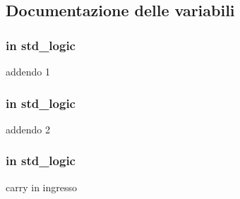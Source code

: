 \subsection{Documentazione delle variabili}
\subsubsection[{\texorpdfstring{add1}{add1}}]{ {\bfseries \textcolor{vhdlchar}{in}\textcolor{vhdlchar}{ }} {\bfseries \textcolor{vhdlchar}{std\+\_\+logic}\textcolor{vhdlchar}{ }} \hspace{0.3cm}{\ttfamily [Port]}}\hypertarget{group___base_cell_ga2b16ee1ce0d8ffb8f85ccea13f8ba38d}{}\label{group___base_cell_ga2b16ee1ce0d8ffb8f85ccea13f8ba38d}


addendo 1 

\subsubsection[{\texorpdfstring{add2}{add2}}]{ {\bfseries \textcolor{vhdlchar}{in}\textcolor{vhdlchar}{ }} {\bfseries \textcolor{vhdlchar}{std\+\_\+logic}\textcolor{vhdlchar}{ }} \hspace{0.3cm}{\ttfamily [Port]}}\hypertarget{group___base_cell_gac3ebb689e34fc5e7657726b18d8b5369}{}\label{group___base_cell_gac3ebb689e34fc5e7657726b18d8b5369}


addendo 2 

\subsubsection[{\texorpdfstring{carryin}{carryin}}]{ {\bfseries \textcolor{vhdlchar}{in}\textcolor{vhdlchar}{ }} {\bfseries \textcolor{vhdlchar}{std\+\_\+logic}\textcolor{vhdlchar}{ }} \hspace{0.3cm}{\ttfamily [Port]}}\hypertarget{group___base_cell_gaa556a73dc4a4de1a0d662b25adbcbe33}{}\label{group___base_cell_gaa556a73dc4a4de1a0d662b25adbcbe33}


carry in ingresso 

